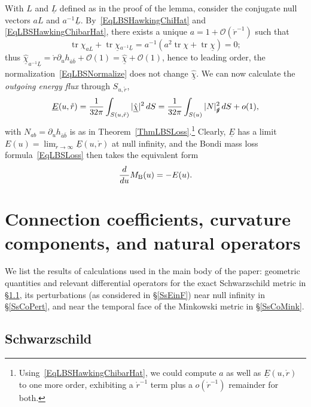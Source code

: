 \documentclass[reqno,11pt,letterpaper]{amsart}
\numberwithin{equation}{section}
\numberwithin{figure}{section}
\theoremstyle{definition}
\theoremstyle{remark}
\newcommand{\mc}{\mathcal}
\newcommand{\cO}{\mc O}
\newcommand{\slg}{\slashed{g}{}}
\newcommand{\tr}{\operatorname{tr}}
\newcommand{\pa}{\partial}
\newcommand{\ul}[1]{\underline{#1}{}}
\begin{document}
With $L$ and $\ul L$ defined as in the proof of the lemma, consider the conjugate null vectors $a L$ and $a^{-1}\ul L$. By~\eqref{EqLBSHawkingChiHat} and \eqref{EqLBSHawkingChibarHat}, there exists a unique $a=1+\cO(\mathring r^{-1})$ such that
\begin{equation}
\label{EqLBSNormalize}
  \tr\chi_{a L}+\tr\ul\chi_{a^{-1}\ul L}=a^{-1}(a^2\tr\chi+\tr\ul\chi)=0;
\end{equation}
thus $\hat{\ul\chi}_{a^{-1}\ul L}=\mathring r\pa_u h_{\bar a\bar b}+\cO(1)=\hat{\ul\chi}+\cO(1)$, hence to leading order, the normalization~\eqref{EqLBSNormalize} does not change $\hat{\ul\chi}$. We can now calculate the \emph{outgoing energy flux} through $S_{u,\mathring r}$,
\[
  \ul E(u,\mathring r) = \frac{1}{32\pi}\int_{S(u,\mathring r)} |\hat{\ul\chi}|^2\,d S = \frac{1}{32\pi}\int_{S(u)} |N|_{\slg}^2\,d S + o(1),
\]
with $N_{a b}=\pa_u h_{\bar a\bar b}$ is as in Theorem~\ref{ThmLBSLoss}.\footnote{Using~\eqref{EqLBSHawkingChibarHat}, we could compute $a$ as well as $\ul E(u,\mathring r)$ to one more order, exhibiting a $\mathring r^{-1}$ term plus a $o(\mathring r^{-1})$ remainder for both.} Clearly, $\ul E$ has a limit $E(u) = \lim_{\mathring r\to\infty} \ul E(u,\mathring r)$ at null infinity, and the Bondi mass loss formula~\eqref{EqLBSLoss} then takes the equivalent form
\[
  \frac{d}{d u}M_{\rm B}(u) = -E(u).
\]




\appendix

\section{Connection coefficients, curvature components, and natural operators}
\label{SCo}

We list the results of calculations used in the main body of the paper: geometric quantities and relevant differential operators for the exact Schwarzschild metric in \S\ref{SsCoSchw}, its perturbations (as considered in \S\ref{SsEinF}) near null infinity in \S\ref{SsCoPert}, and near the temporal face of the Minkowski metric in \S\ref{SsCoMink}.


\subsection{Schwarzschild}
\label{SsCoSchw}
\end{document}
